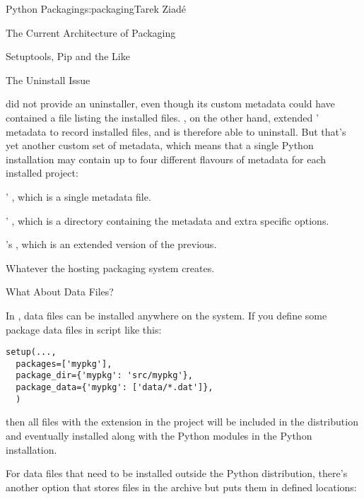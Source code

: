 \begin{aosachapter}{Python Packaging}{s:packaging}{Tarek Ziad\'{e}}
\begin{aosasect1}{The Current Architecture of Packaging}
\begin{aosasect2}{Setuptools, Pip and the Like}
\begin{aosasect3}{The Uninstall Issue}

 did not provide an uninstaller, even though its
custom metadata could have contained a file listing the installed
files.  , on the other hand, extended '
metadata to record installed files, and is therefore able to
uninstall.  But that's yet another custom set of metadata, which means
that a single Python installation may contain up to four different
flavours of metadata for each installed project:

\begin{aosaitemize}

  \item {}' , which is a single metadata
  file.

  \item {}' , which is a directory
  containing the metadata and extra  specific
  options.

  \item {}'s , which is an extended version of
  the previous.

  \item Whatever the hosting packaging system creates.

\end{aosaitemize}

\end{aosasect3}

\end{aosasect2}

\begin{aosasect2}{What About Data Files?}

In , data files can be installed anywhere on the
system.  If you define some package data files in 
script like this:

\begin{verbatim}
setup(...,
  packages=['mypkg'],
  package_dir={'mypkg': 'src/mypkg'},
  package_data={'mypkg': ['data/*.dat']},
  )
\end{verbatim}

\noindent then all files with the  extension in the 
project will be included in the distribution and eventually installed
along with the Python modules in the Python installation.

For data files that need to be installed outside the Python distribution, 
there's another option that stores files in the archive but puts them in defined
locations:


\end{aosasect2}
\end{aosasect1}
\end{aosachapter}
